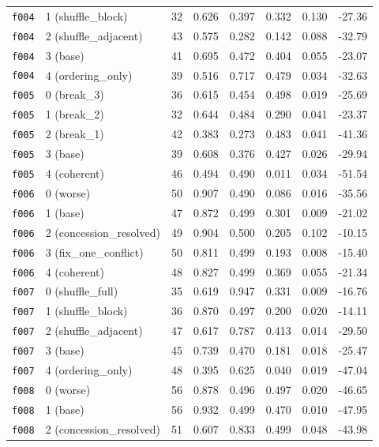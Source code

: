 \documentclass[11pt]{article}
\begin{document}
\begin{table}[htbp]
\begin{tabular}{llrrrrrr}
\texttt{f004} & 1 (shuffle\_block) & 32 & 0.626 & 0.397 & 0.332 & 0.130 & -27.36 \\
\texttt{f004} & 2 (shuffle\_adjacent) & 43 & 0.575 & 0.282 & 0.142 & 0.088 & -32.79 \\
\texttt{f004} & 3 (base) & 41 & 0.695 & 0.472 & 0.404 & 0.055 & -23.07 \\
\texttt{f004} & 4 (ordering\_only) & 39 & 0.516 & 0.717 & 0.479 & 0.034 & -32.63 \\
\midrule
\texttt{f005} & 0 (break\_3) & 36 & 0.615 & 0.454 & 0.498 & 0.019 & -25.69 \\
\texttt{f005} & 1 (break\_2) & 32 & 0.644 & 0.484 & 0.290 & 0.041 & -23.37 \\
\texttt{f005} & 2 (break\_1) & 42 & 0.383 & 0.273 & 0.483 & 0.041 & -41.36 \\
\texttt{f005} & 3 (base) & 39 & 0.608 & 0.376 & 0.427 & 0.026 & -29.94 \\
\texttt{f005} & 4 (coherent) & 46 & 0.494 & 0.490 & 0.011 & 0.034 & -51.54 \\
\midrule
\texttt{f006} & 0 (worse) & 50 & 0.907 & 0.490 & 0.086 & 0.016 & -35.56 \\
\texttt{f006} & 1 (base) & 47 & 0.872 & 0.499 & 0.301 & 0.009 & -21.02 \\
\texttt{f006} & 2 (concession\_resolved) & 49 & 0.904 & 0.500 & 0.205 & 0.102 & -10.15 \\
\texttt{f006} & 3 (fix\_one\_conflict) & 50 & 0.811 & 0.499 & 0.193 & 0.008 & -15.40 \\
\texttt{f006} & 4 (coherent) & 48 & 0.827 & 0.499 & 0.369 & 0.055 & -21.34 \\
\midrule
\texttt{f007} & 0 (shuffle\_full) & 35 & 0.619 & 0.947 & 0.331 & 0.009 & -16.76 \\
\texttt{f007} & 1 (shuffle\_block) & 36 & 0.870 & 0.497 & 0.200 & 0.020 & -14.11 \\
\texttt{f007} & 2 (shuffle\_adjacent) & 47 & 0.617 & 0.787 & 0.413 & 0.014 & -29.50 \\
\texttt{f007} & 3 (base) & 45 & 0.739 & 0.470 & 0.181 & 0.018 & -25.47 \\
\texttt{f007} & 4 (ordering\_only) & 48 & 0.395 & 0.625 & 0.040 & 0.019 & -47.04 \\
\midrule
\texttt{f008} & 0 (worse) & 56 & 0.878 & 0.496 & 0.497 & 0.020 & -46.65 \\
\texttt{f008} & 1 (base) & 56 & 0.932 & 0.499 & 0.470 & 0.010 & -47.95 \\
\texttt{f008} & 2 (concession\_resolved) & 51 & 0.607 & 0.833 & 0.499 & 0.048 & -43.98 \\

\end{tabular}
\end{table}
\end{document}
